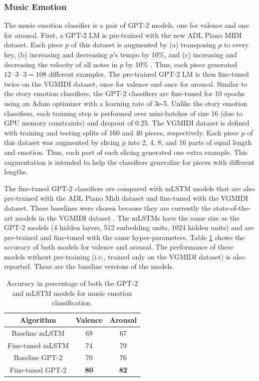 \subsubsection{Music Emotion}

The music emotion classifier is a pair of GPT-2 models, one for valence and one for arousal. First, a GPT-2 LM is pre-trained with the new ADL Piano MIDI dataset. Each piece $p$ of this dataset is augmented by (a) transposing $p$ to every key, (b) increasing and decreasing $p$'s tempo by 10\%, and (c) increasing and decreasing the velocity of all notes in $p$ by 10\% \cite{oore2017learning}. Thus, each piece generated $12 \cdot 3 \cdot 3 = 108$ different examples. The pre-trained GPT-2 LM is then fine-tuned twice on the VGMIDI dataset, once for valence and once for arousal. Similar to the story emotion classifiers, the GPT-2 classifiers are fine-tuned for 10 epochs using an Adam optimizer with a learning rate of 3e-5. Unlike the story emotion classifiers, each training step is performed over mini-batches of size 16 (due to GPU memory constraints) and dropout of 0.25. The VGMIDI dataset is defined with training and testing splits of 160 and 40 pieces, respectively. Each piece $p$ of this dataset was augmented by slicing $p$ into 2, 4, 8, and 16 parts of equal length and emotion. Thus, each part of each slicing generated one extra example. This augmentation is intended to help the classifiers generalize for pieces with different lengths.

The fine-tuned GPT-2 classifiers are compared with mLSTM models that are also pre-trained with the ADL Piano Midi dataset and fine-tuned with the VGMIDI dataset. These baselines were chosen because they are currently the state-of-the-art models in the VGMIDI dataset \cite{ferreira_2019}. The mLSTMs have the same size as the GPT-2 models (4 hidden layers, 512 embedding units, 1024 hidden units) and are pre-trained and fine-tuned with the same hyper-parameters. Table \ref{tab:sent_accuracy} shows the accuracy of both models for valence and arousal. The performance of these models without pre-training (i.e., trained only on the VGMIDI dataset) is also reported. These are the baseline versions of the models.

\begin{table}[h!]
    \centering
    \begin{tabular}{ccc}
    \toprule
    \textbf{Algorithm} & \textbf{Valence} & \textbf{Arousal} \\
    \midrule
    Baseline mLSTM & 69 & 67 \\
    Fine-tuned mLSTM & 74 & 79 \\
    Baseline GPT-2 & 70 & 76 \\
    Fine-tuned GPT-2 & \textbf{80} & \textbf{82} \\
    \bottomrule
    \end{tabular}
    \caption{Accuracy in percentage of both the GPT-2 and mLSTM models for music emotion classification. }
    \label{tab:sent_accuracy}
\end{table}

